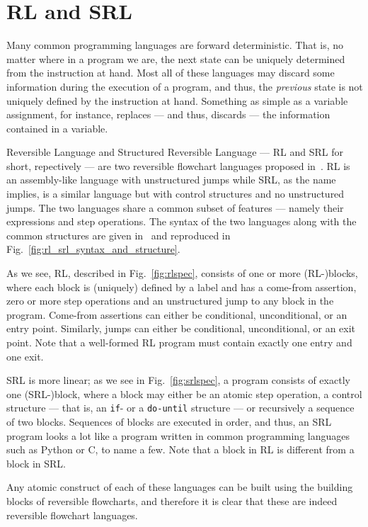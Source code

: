 
\section{RL and SRL}\label{sec:rlandsrl}

Many common programming languages are forward deterministic. That is, no matter where in a program we are, the next state can be uniquely determined from the instruction at hand. Most all of these languages may discard some information during the execution of a program, and thus, the \textit{previous} state is not uniquely defined by the instruction at hand. Something as simple as a variable assignment, for instance, replaces --- and thus, discards --- the information contained in a variable.

Reversible Language and Structured Reversible Language --- RL and SRL for short, repectively --- are two reversible flowchart languages proposed in~\cite{REV}. RL is an assembly-like language with unstructured jumps while SRL, as the name implies, is a similar language but with control structures and no unstructured jumps. The two languages share a common subset of features --- namely their expressions and step operations. The syntax of the two languages along with the common structures are given in~\cite[Fig.~12]{REV} and reproduced in Fig.~\ref{fig:rl_srl_syntax_and_structure}.

As we see, RL, described in Fig.~\ref{fig:rlspec}, consists of one or more (RL-)blocks, where each block is (uniquely) defined by a label and has a come-from assertion, zero or more step operations and an unstructured jump to any block in the program. Come-from assertions can either be conditional, unconditional, or an entry point. Similarly, jumps can either be conditional, unconditional, or an exit point. Note that a well-formed RL program must contain exactly one entry and one exit.

SRL is more linear; as we see in Fig.~\ref{fig:srlspec}, a program consists of exactly one (SRL-)block, where a block may either be an atomic step operation, a control structure --- that is, an \texttt{if}- or a \texttt{do-until} structure --- or recursively a sequence of two blocks. Sequences of blocks are executed in order, and thus, an SRL program looks a lot like a program written in common programming languages such as Python or C, to name a few. Note that a block in RL is different from a block in SRL.

Any atomic construct of each of these languages can be built using the building blocks of reversible flowcharts, and therefore it is clear that these are indeed reversible flowchart languages.

